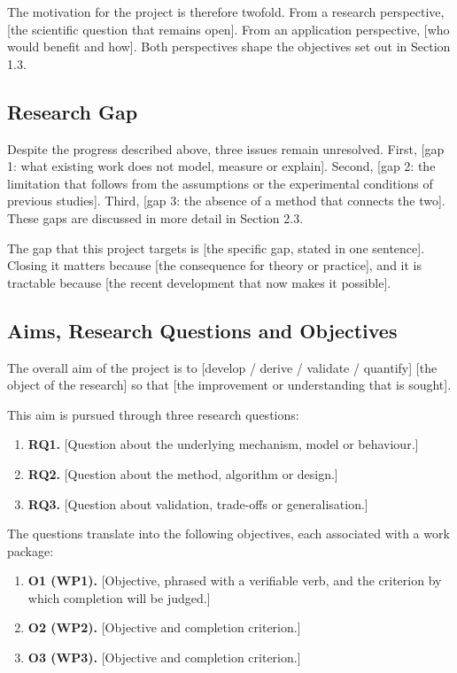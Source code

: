 \documentclass{article}
\begin{document}
The motivation for the project is therefore twofold. From a research perspective, [the
scientific question that remains open]. From an application perspective, [who would benefit
and how]. Both perspectives shape the objectives set out in Section 1.3.

\subsection{Research Gap}
Despite the progress described above, three issues remain unresolved. First, [gap 1: what
existing work does not model, measure or explain]. Second, [gap 2: the limitation that follows
from the assumptions or the experimental conditions of previous studies]. Third, [gap 3: the
absence of a method that connects the two]. These gaps are discussed in more detail in
Section 2.3.

The gap that this project targets is [the specific gap, stated in one sentence]. Closing it
matters because [the consequence for theory or practice], and it is tractable because [the
recent development that now makes it possible].

\subsection{Aims, Research Questions and Objectives}
The overall aim of the project is to [develop / derive / validate / quantify] [the object of
the research] so that [the improvement or understanding that is sought].

This aim is pursued through three research questions:
\begin{enumerate}[leftmargin=*]
    \item \textbf{RQ1.} [Question about the underlying mechanism, model or behaviour.]
    \item \textbf{RQ2.} [Question about the method, algorithm or design.]
    \item \textbf{RQ3.} [Question about validation, trade-offs or generalisation.]
\end{enumerate}

The questions translate into the following objectives, each associated with a work package:
\begin{enumerate}[leftmargin=*]
    \item \textbf{O1 (WP1).} [Objective, phrased with a verifiable verb, and the criterion by
    which completion will be judged.]
    \item \textbf{O2 (WP2).} [Objective and completion criterion.]
    \item \textbf{O3 (WP3).} [Objective and completion criterion.]
\end{enumerate}
\end{document}
